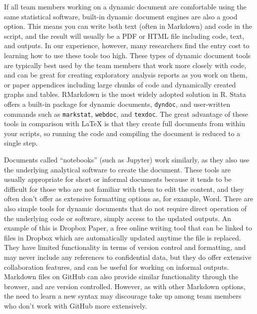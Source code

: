 If all team members working on a dynamic document are comfortable using the same statistical software,
built-in dynamic document engines are also a good option.
This means you can write both text (often in Markdown) and code in the script,
and the result will usually be a PDF or HTML file including code, text, and outputs.
In our experience, however, many researchers find the entry cost to learning how to use these tools too high.
These types of dynamic document tools are typically best used by the team members that work more closely with code,
and can be great for creating exploratory analysis reports as you work on them, 
or paper appendices including large chunks of code and dynamically created graphs and tables.
RMarkdown is the most widely adopted solution in R.
Stata offers a built-in package for dynamic documents, \texttt{dyndoc}, 
and user-written commands such as \texttt{markstat},
\texttt{webdoc}, and
\texttt{texdoc}.
The great advantage of these tools in comparison with LaTeX is that 
they create full documents from within your scripts, 
so running the code and compiling the document is reduced to a single step.

Documents called ``notebooks'' (such as Jupyter) work similarly,
as they also use the underlying analytical software to create the document.
These tools are usually appropriate for short or informal documents
because it tends to be difficult for those who are not familiar with them to edit the content,
and they often don't offer as extensive formatting options as, for example, Word.
There are also simple tools for dynamic documents
that do not require direct operation of the underlying code or software,
simply access to the updated outputs.
An example of this is Dropbox Paper,
a free online writing tool that can be linked to files in Dropbox
which are automatically updated anytime the file is replaced.
They have limited functionality in terms of version control and formatting,
and may never include any references to confidential data,
but they do offer extensive collaboration features, 
and can be useful for working on informal outputs. 
Markdown files on GitHub can also provide similar functionality through the browser,
and are version controlled.
However, as with other Markdown options, the need to learn a new syntax may
discourage take up among team members who don't work with GitHub more extensively.

